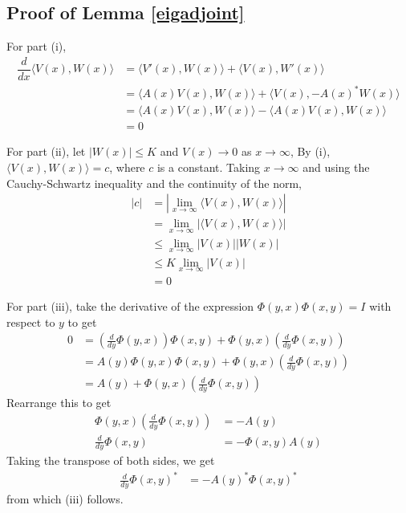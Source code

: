 \documentclass[thesis.tex]{subfiles}
\begin{document}
\subsection{Proof of Lemma \ref{eigadjoint}}

For part (i), 
\begin{align*}
\dfrac{d}{dx}\langle V(x), W(x) \rangle &= 
\langle V'(x), W(x) \rangle + \langle V(x), W'(x) \rangle \\
&= \langle A(x)V(x), W(x) \rangle + \langle V(x), -A(x)^* W(x) \rangle \\
&= \langle A(x)V(x), W(x) \rangle - \langle A(x)V(x), W(x) \rangle \\
&= 0
\end{align*}

For part (ii), let $|W(x)| \leq K$ and $V(x) \rightarrow 0$ as $x \rightarrow \infty$, By (i), $\langle V(x), W(x) \rangle = c$, where $c$ is a constant. Taking $x \rightarrow \infty$ and using the Cauchy-Schwartz inequality and the continuity of the norm,
\begin{align*}
|c| &= \left| \lim_{x\rightarrow \infty} \langle V(x), W(x) \rangle \right| \\
&= \lim_{x\rightarrow \infty} \left| \langle V(x), W(x) \rangle \right| \\
&\leq \lim_{x\rightarrow \infty} |V(x)||W(x)| \\
&\leq K \lim_{x\rightarrow \infty} |V(x)| \\
&= 0
\end{align*}

For part (iii), take the derivative of the expression $\Phi(y, x)\Phi(x, y) = I$ with respect to $y$ to get
\begin{align*}
0 &= \left(\frac{d}{dy}\Phi(y, x)\right) \Phi(x, y) +
\Phi(y, x)\left(\frac{d}{dy}\Phi(x, y)\right) \\
&= A(y)\Phi(y, x) \Phi(x, y) +
\Phi(y, x)\left(\frac{d}{dy}\Phi(x, y)\right) \\
&= A(y) + \Phi(y, x)\left(\frac{d}{dy}\Phi(x, y)\right) 
\end{align*}
Rearrange this to get
\begin{align*}
\Phi(y, x)\left(\frac{d}{dy}\Phi(x, y)\right) &= -A(y) \\
\frac{d}{dy}\Phi(x, y) &= -\Phi(x, y) A(y) 
\end{align*}
Taking the transpose of both sides, we get
\begin{align*}
\frac{d}{dy}\Phi(x, y)^* &= -A(y)^* \Phi(x, y)^*  
\end{align*}
from which (iii) follows.
\end{document}
